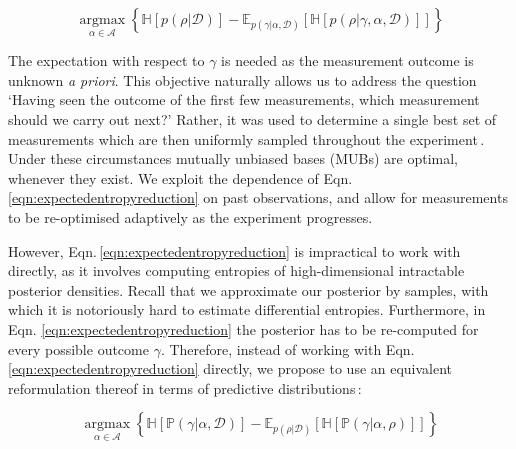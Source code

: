 \documentclass[aps,twocolumn,prl]{revtex4-1}
\newcommand{\param}{{\rho}} \newcommand{\data}{\mathcal{D}}
\newcommand{\argmax}{ \operatorname*{argmax}}
\newcommand{\config}{\alpha} \newcommand{\configset}{\mathcal{A}}
\newcommand{\outcome}{\gamma} \newcommand{\ie}{i.\,e.\ }
\begin{document}
\begin{equation}
\argmax_{\config\in\configset} \left\{ \mathbb{H}\left[p(\param|\data)\right] - \mathbb{E}_{p(\outcome\vert\config,\data)}\left[\mathbb{H}\left[ p(\param|\outcome,\config,\data) \right] \right]\right\}\label{eqn:expectedentropyreduction}
\end{equation} 


The expectation with respect to $\outcome$ is needed as the measurement outcome is unknown \emph{a priori}. This objective naturally allows us to address the question `Having seen the outcome of the first few measurements, which measurement should we carry out next?'
Rather, it was used to determine a single best set of measurements which are then uniformly sampled throughout the experiment\,\cite{MUBFirst,ExactInformation}. Under these circumstances mutually unbiased bases (MUBs) are optimal, whenever they exist. We exploit the dependence of Eqn.\,\eqref{eqn:expectedentropyreduction} on past observations, and allow for measurements to be re-optimised adaptively as the experiment progresses.

However, Eqn.\,\eqref{eqn:expectedentropyreduction}  is impractical to work with directly, as it involves computing entropies of high-dimensional intractable posterior densities. Recall that we approximate our posterior by samples, with which it is notoriously hard to estimate differential entropies. Furthermore, in Eqn. \eqref{eqn:expectedentropyreduction} the posterior has to be re-computed for every possible outcome $\outcome$. Therefore, instead of working with Eqn.\,\eqref{eqn:expectedentropyreduction} directly, we propose to use an equivalent reformulation thereof in terms of predictive distributions\,\cite{ExactInformation}:

\begin{equation}
\argmax_{\config\in\configset} \left\{ \mathbb{H}\left[\mathbb{P}(\outcome|\config,\data)\right] - \mathbb{E}_{p(\param\vert\data)}\left[\mathbb{H}\left[ \mathbb{P}(\outcome|\config,\param) \right] \right]\right\}\label{eqn:rearrangement}
\end{equation}
\end{document}
